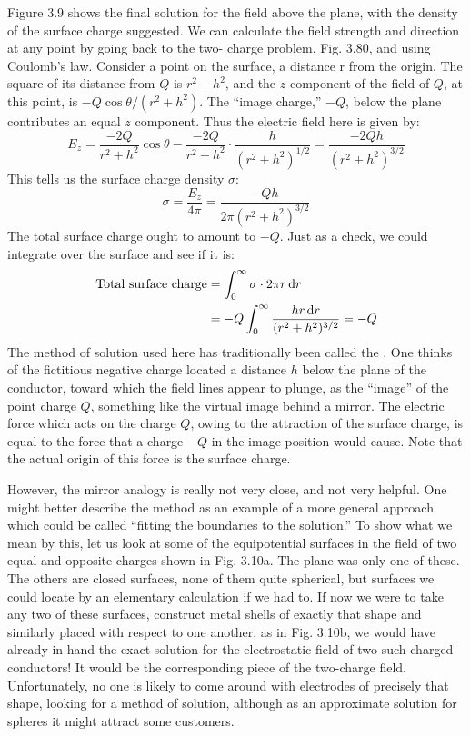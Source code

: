 Figure 3.9 shows the final solution for the field above the plane,
with the density of the surface charge suggested. We can calculate
the field strength and direction at any point by going back to the two-
charge problem, Fig. 3.80, and using Coulomb's law. Consider a
point on the surface, a distance r from the origin. The square of its
distance from $Q$ is $r^2 + h^2$, and the $z$ component of the field of $Q$,
at this point, is $-Q \cos \theta/(r^2 + h^2)$. The ``image charge,'' $-Q$,
below the plane contributes an equal $z$ component. Thus the electric
field here is given by:
\begin{equation}
  E_z = \frac{-2Q}{r^2+h^2}\cos\theta - \frac{-2Q}{r^2+h^2}\cdot\frac{h}{(r^2+h^2)^{1/2}}
       = \frac{-2Qh}{(r^2+h^2)^{3/2}}
\end{equation}
This tells us the surface charge density $\sigma$:
\begin{equation}
  \sigma = \frac{E_z}{4\pi}  = \frac{-Qh}{2\pi(r^2+h^2)^{3/2}}
\end{equation}
The total surface charge ought to amount to $-Q$. Just as a check,
we could integrate over the surface and see if it is:
\begin{align}
\begin{split}
  \text{Total surface charge} &= \int_0^\infty \sigma\cdot2\pi r\operatorname{d\!} r \\
           &= -Q \int_0^\infty \frac{hr\operatorname{d\!} r}{(r^2+h^2)^{3/2}} = -Q
\end{split}
\end{align}
The method of solution used here has traditionally been called
the . One thinks of the fictitious negative charge
located a distance $h$ below the plane of the conductor, toward which
the field lines appear to plunge, as the ``image'' of the point charge $Q$,
something like the virtual image behind a mirror. The electric force
which acts on the charge $Q$, owing to the attraction of the surface
charge, is equal to the force that a charge $-Q$ in the image position
would cause. Note that the actual origin of this force is the surface
charge.

However, the mirror analogy is really not very close, and not very
helpful. One might better describe the method as an example of a
more general approach which could be called ``fitting the boundaries
to the solution.'' To show what we mean by this, let us look at some
of the equipotential surfaces in the field of two equal and opposite
charges shown in Fig. 3.10a. The plane was only one of these. The
others are closed surfaces, none of them quite spherical, but surfaces
we could locate by an elementary calculation if we had to. If now
we were to take any two of these surfaces, construct metal shells of
exactly that shape and similarly placed with respect to one another,
as in Fig. 3.10b, we would have already in hand the exact solution
for the electrostatic field of two such charged conductors! It would
be the corresponding piece of the two-charge field. Unfortunately,
no one is likely to come around with electrodes of precisely that
shape, looking for a method of solution, although as an approximate
solution for spheres it might attract some customers.

